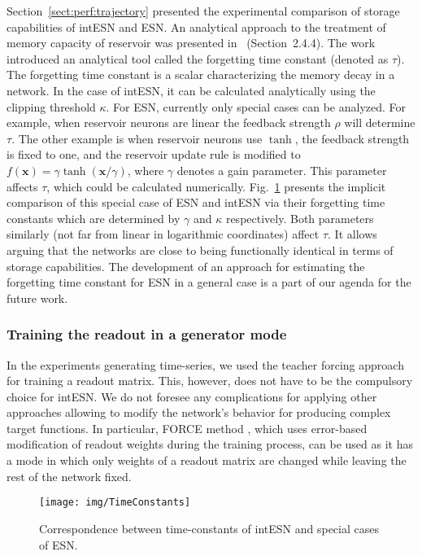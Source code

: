 Section~\ref{sect:perf:trajectory} presented the experimental comparison of storage capabilities of intESN and ESN. 
An analytical approach to the treatment of memory capacity of reservoir was presented in~\cite{Frady17} (Section~2.4.4). 
The work introduced an analytical tool called the forgetting time constant (denoted as $\tau$). The forgetting time constant is a scalar characterizing the memory decay in a network. In the case of intESN, it can be calculated analytically using the clipping threshold $\kappa$. For ESN, currently only special cases can be analyzed. For example, when reservoir neurons are linear the feedback strength $\rho$ will determine $\tau$. The other example is when reservoir neurons use $\tanh$, the feedback strength is fixed to one, and the reservoir update rule is modified to $f(\textbf{x})=\gamma \tanh( \textbf{x} / \gamma)$, where $\gamma$ denotes a gain parameter. This parameter affects $\tau$, which could be calculated numerically. Fig.~\ref{fig:time:const} presents the implicit comparison of this special case of ESN and intESN via their forgetting time constants which are determined by $\gamma$ and $\kappa$ respectively. Both parameters similarly (not far from linear in logarithmic coordinates) affect $\tau$. It allows arguing that the networks are close to being functionally identical in terms of storage capabilities. The development of an approach for estimating the forgetting time constant for ESN in a general case is a part of our agenda for the future work.




\subsubsection{Training the readout in a generator mode}

In the experiments generating time-series, we used the teacher forcing approach for training a readout matrix. This, however, does not have to be the compulsory choice for intESN. We do not foresee any complications for applying other approaches allowing to modify the network's behavior for producing complex target functions. In particular, FORCE method \cite{Sussillo2009}, which uses error-based modification of readout weights during the training process, can be used as it has a mode in which only weights of a readout matrix are changed while leaving the rest of the network fixed. 


\begin{figure}[tb]%
\centering
\texttt{[image: img/TimeConstants]}
\caption{
Correspondence between time-constants of intESN and special cases of ESN.
}
\label{fig:time:const}
\end{figure}

